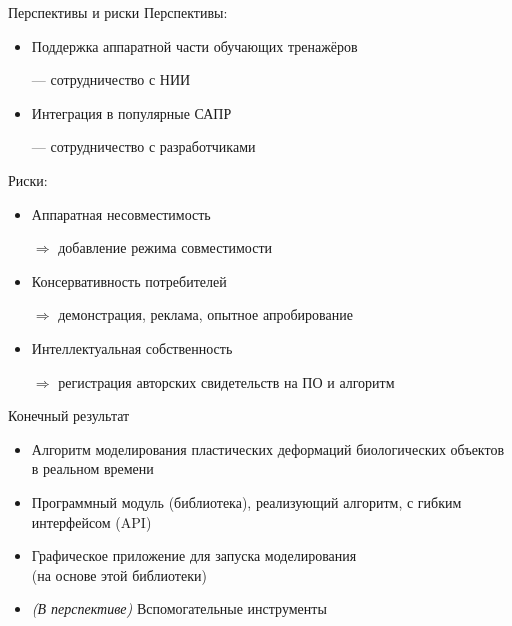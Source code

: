 \documentclass[usenames,dvipsnames,pdftex,unicode,hidelinks]{beamer}
\begin{document}
  \begin{frame}{Перспективы и риски}
    Перспективы:
    \begin{itemize}
      \item Поддержка аппаратной части обучающих тренажёров
        \par{
          \scriptsize
          --- сотрудничество с НИИ
        }
      \item Интеграция в популярные САПР
        \par{
          \scriptsize
          --- сотрудничество с разработчиками
        }
    \end{itemize}

    Риски:
    \begin{itemize}
      \item Аппаратная несовместимость
        \par{
          \scriptsize
          $\Longrightarrow$ добавление режима совместимости
        }
      \item Консервативность потребителей
        \par{
          \scriptsize
          $\Longrightarrow$ демонстрация, реклама, опытное апробирование
        }
      \item Интеллектуальная собственность
        \par{
          \scriptsize
          $\Longrightarrow$ регистрация авторских свидетельств на ПО и алгоритм
        }
    \end{itemize}
  \end{frame}

  \begin{frame}{Конечный результат}
    \begin{itemize}
      \setlength{\itemsep}{5mm}
      \item Алгоритм моделирования пластических деформаций биологических объектов в
        реальном времени
      \item Программный модуль (библиотека), реализующий алгоритм, с гибким интерфейсом (API)
      \item Графическое приложение для запуска моделирования \\(на основе этой библиотеки)
      \item \emph{(В перспективе)} Вспомогательные инструменты
    \end{itemize}
  \end{frame}


\end{document}
